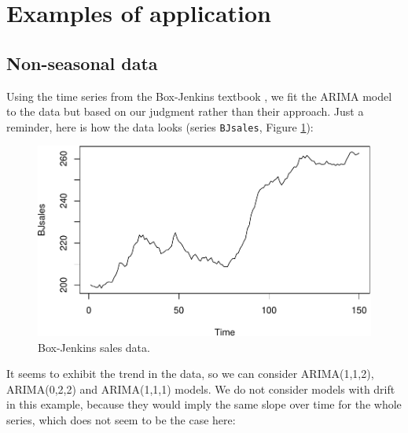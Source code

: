 \documentclass[
]{book}
\theoremstyle{definition}
\theoremstyle{definition}
\theoremstyle{definition}
\theoremstyle{definition}
\theoremstyle{remark}
\begin{document}
\hypertarget{ARIMAExampleInR}{%
\section{Examples of application}\label{ARIMAExampleInR}}

\hypertarget{non-seasonal-data-2}{%
\subsection{Non-seasonal data}\label{non-seasonal-data-2}}

Using the time series from the Box-Jenkins textbook \citep{Box1976}, we fit the ARIMA model to the data but based on our judgment rather than their approach. Just a reminder, here is how the data looks (series \texttt{BJsales}, Figure \ref{fig:BJSalesPlot}):

\begin{figure}
\centering
\includegraphics{Svetunkov--2022----ADAM_files/figure-latex/BJSalesPlot-1.pdf}
\caption{\label{fig:BJSalesPlot}Box-Jenkins sales data.}
\end{figure}

It seems to exhibit the trend in the data, so we can consider ARIMA(1,1,2), ARIMA(0,2,2) and ARIMA(1,1,1) models. We do not consider models with drift in this example, because they would imply the same slope over time for the whole series, which does not seem to be the case here:
\end{document}
